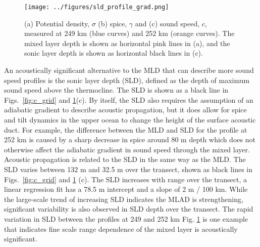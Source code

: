 \documentclass[preprint,NumberedRefs]{JASA}
\begin{document}
\begin{figure}
\texttt{[image: ../figures/sld\_profile\_grad.png]}
    \caption{\label{fig:profiles}{(a) Potential density, $\sigma$ (b) spice, $\gamma$ and (c) sound speed, $c$, measured at 249 km (blue curves) and 252 km (orange curves). The mixed layer depth is shown as horizontal pink lines in (a), and the sonic layer depth is shown as horizontal black lines in (c).}}
\end{figure}

An acoustically significant alternative to the MLD that can describe more sound speed profiles is the sonic layer depth (SLD), defined as the depth of maximum sound speed above the thermocline. The SLD is shown as a black line in Figs.~\ref{fig:c_grid} and \ref{fig:profiles}(c). By itself, the SLD also requires the assumption of an adiabatic gradient to describe acoustic propagation, but it does allow for spice and tilt dynamics in the upper ocean to change the height of the surface acoustic duct. For example, the difference between the MLD and SLD for the profile at 252 km is caused by a sharp decrease in spice around 80 m depth which does not otherwise affect the adiabatic gradient in sound speed through the mixed layer. Acoustic propagation is related to the SLD in the same way as the MLD. The SLD varies between 132 m and 32.5 m over the transect, shown as black lines in Figs.~\ref{fig:c_grid} and \ref{fig:profiles} (c). The SLD increases with range over the transect, a linear regression fit has a 78.5 m intercept and a slope of 2 m / 100 km. While the large-scale trend of increasing SLD indicates the MLAD is strengthening, significant variability is also observed in SLD depth over the transect. The rapid variation in SLD between the profiles at 249 and 252 km Fig. \ref{fig:profiles} is one example that indicates fine scale range dependence of the mixed layer is acoustically significant.
\end{document}
